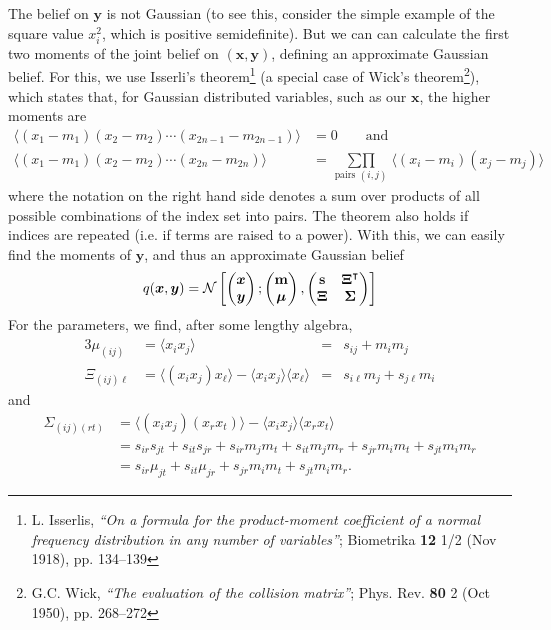 \documentclass[a4paper]{article}
\newcommand{\bfm}{{\bf m}}
\newcommand{\bfs}{{\bf s}}
\newcommand{\N}{\mathcal{N}}
\newcommand{\T}{^{\top}}
\renewcommand{\vec}[1]{\boldsymbol{#1}}
\newcommand{\mat}[1]{\boldsymbol{#1}}
\newcommand{\bfmu}{\vec\mu}
\newcommand{\bfSig}{\mat{\Sigma}}
\newcommand{\bfx}{\vec{x}}
\newcommand{\bfy}{\vec{y}}
\newcommand{\<}{\langle}
\renewcommand{\>}{\rangle}
\renewcommand{\T}{^\intercal}%
\newcommand{\bfxi}{\mat{\Xi}}
\begin{document}
The belief on $\bfy$ is not Gaussian (to see this, consider the simple
example of the square value $x_i ^2$, which is positive
semidefinite). But we can can calculate the first two moments of the
joint belief on $(\bfx,\bfy)$, defining an approximate Gaussian
belief. For this, we use {\sc Isserli}'s theorem\footnote{L. Isserlis,
  \emph{``On a formula for the product-moment coefficient of a normal
    frequency distribution in any number of variables''}; Biometrika
  \textbf{12} 1/2 (Nov 1918), pp. 134--139} (a special case of {\sc
  Wick}'s theorem\footnote{G.C. Wick, \emph{``The evaluation of the
    collision matrix''}; Phys. Rev. \textbf{80} 2 (Oct 1950),
  pp. 268--272}), which states that, for Gaussian distributed
variables, such as our $\bfx$, the higher moments are
\begin{equation}
  \label{eq:3}
  \begin{aligned}
  \<(x_1 - m_1)(x_2-m_2)\cdots (x_{2n-1} - m_{2n -1})\> &= 0 \qquad \text{and}\\
  \<(x_1 - m_1)(x_2-m_2)\cdots (x_{2n}-m_{2n})\> &= \operatorname*{\sum\prod}_{\text{pairs } (i,j)} \<(x_i-m_i)(x_j-m_j)\>    
  \end{aligned}
\end{equation}
where the notation on the right hand side denotes a sum over products
of all possible combinations of the index set into pairs. The theorem
also holds if indices are repeated (i.e. if terms are raised to a
power). With this, we can easily find the moments of $\bfy$, and thus
an approximate Gaussian belief 
\begin{equation}
  \label{eq:12}
  q(\bfx,\bfy) = \N \left[
    \begin{pmatrix}
      \bfx \\ \bfy
    \end{pmatrix};
    \begin{pmatrix}
      \bfm \\ \bfmu
    \end{pmatrix},
    \begin{pmatrix}
      \bfs & \bfxi\T \\ \bfxi & \bfSig
    \end{pmatrix}
\right]
\end{equation}
For the parameters, we find, after some lengthy algebra,
\begin{alignat}{3}
  \label{eq:4}
  \mu_{(ij)} &= \< x_i x_j \> &=& s_{ij} + m_i m_j\\
  \Xi_{(ij)\ell} &= \<(x_ix_j)x_\ell\> -
   \<x_ix_j\>\<x_\ell\> &=& s_{i\ell}m_j + s_{j\ell} m_i
 \end{alignat}
and
\begin{equation}
  \label{eq:5}
  \begin{aligned}
  \Sigma_{(ij)(rt)} &= \<(x_ix_j)(x_rx_t)\> -
   \<x_ix_j\>\<x_rx_t\> \\
&= s_{ir}s_{jt} + s_{it}s_{jr} + s_{ir}m_jm_t + s_{it} m_j m_r +
s_{jr} m_i m_t + s_{jt} m_i m_r\\
&= s_{ir}\mu_{jt} + s_{it}\mu_{jr} + s_{jr}m_im_t + s_{jt}m_im_r.
   \end{aligned}
\end{equation}
\end{document}
